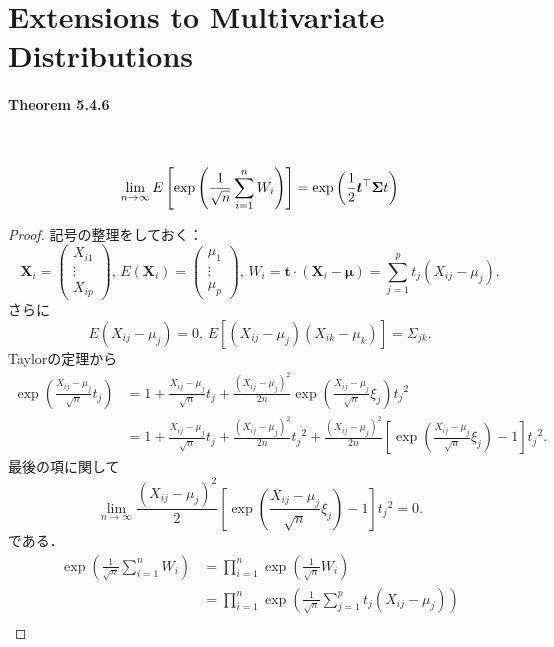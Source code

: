 \setcounter{section}{3}
\section{Extensions to Multivariate Distributions}
\paragraph{Theorem 5.4.6}~
\begin{screen}
  \[ \lim_{n\to\infty} E \left[ \exp \left( \frac{1}{\sqrt{n}} \sum_{i=1}^n W_i \right) \right] = \exp \left( \frac{1}{2} \boldsymbol{t}^\top {} \boldsymbol\Sigma \boldmath{t} \right) \]
\end{screen}
\begin{proof}
  記号の整理をしておく：
  \[ \boldsymbol{X}_i =
  \begin{pmatrix}
    X_{i1} \\ \vdots \\ X_{ip}
  \end{pmatrix}
  , \,
  E(\boldsymbol{X}_i) =
  \begin{pmatrix}
    \mu_{1} \\ \vdots \\ \mu_{p}
  \end{pmatrix}
  , \,
  W_i = \boldsymbol{t} \cdot (\boldsymbol{X}_i - \boldsymbol{\mu}) = \sum_{j=1}^p t_j (X_{ij} - \mu_j) .
  \]
  さらに
  \[ E(X_{ij}-\mu_j) = 0 , \, E[(X_{ij}-\mu_j)(X_{ik}-\mu_k)] = \Sigma_{jk} . \]
  Taylorの定理から
  \begin{align*}
    \exp \left( \frac{X_{ij} - \mu_j}{\sqrt{n}} t_j \right)
    &= 1 + \frac{X_{ij} - \mu_j}{\sqrt{n}} t_j
    + \frac{(X_{ij}-\mu_j)^2}{2n} \exp \left( \frac{X_{ij} - \mu_j}{\sqrt{n}} \xi_j \right) t_j{}^2 \\
    &= 1 + \frac{X_{ij} - \mu_j}{\sqrt{n}} t_j
    + \frac{(X_{ij}-\mu_j)^2}{2n} t_j{}^2
    + \frac{(X_{ij}-\mu_j)^2}{2n} \left[\exp \left( \frac{X_{ij} - \mu_j}{\sqrt{n}} \xi_j \right) -1 \right] t_j{}^2 .
  \end{align*}
  最後の項に関して
  \[ \lim_{n\to\infty} \frac{(X_{ij}-\mu_j)^2}{2} \left[\exp \left( \frac{X_{ij} - \mu_j}{\sqrt{n}} \xi_j \right) -1 \right] t_j{}^2 = 0 . \]
  である．
  \begin{align*}
    \exp \left( \frac{1}{\sqrt{n}} \sum_{i=1}^n W_i \right)
    &= \prod_{i=1}^n \exp \left( \frac{1}{\sqrt{n}} W_i \right) \\
    &= \prod_{i=1}^n \exp \left( \frac{1}{\sqrt{n}} \sum_{j=1}^p t_j (X_{ij} - \mu_j) \right)  \\

\end{align*}
\end{proof}
